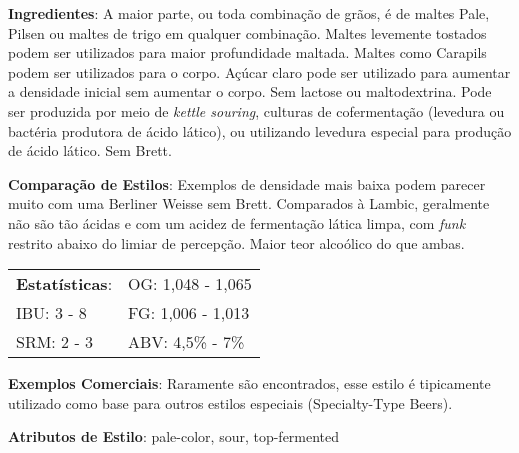 \textbf{Ingredientes}: A maior parte, ou toda combinação de grãos, é de maltes Pale, Pilsen ou maltes de trigo em qualquer combinação. Maltes levemente tostados podem ser utilizados para maior profundidade maltada. Maltes como Carapils podem ser utilizados para o corpo. Açúcar claro pode ser utilizado para aumentar a densidade inicial sem aumentar o corpo. Sem lactose ou maltodextrina. Pode ser produzida por meio de \textit{kettle souring}, culturas de cofermentação (levedura ou bactéria produtora de ácido lático), ou utilizando levedura especial para produção de ácido lático. Sem Brett.

\textbf{Comparação de Estilos}: Exemplos de densidade mais baixa podem parecer muito com uma Berliner Weisse sem Brett. Comparados à Lambic, geralmente não são tão ácidas e com um acidez de fermentação lática limpa, com \textit{funk} restrito abaixo do limiar de percepção. Maior teor alcoólico do que ambas.

\begin{tabular}{@{}p{35mm}p{35mm}@{}}
  \textbf{Estatísticas}: & OG: 1,048 - 1,065 \\
  IBU: 3 - 8  & FG: 1,006 - 1,013 \\
  SRM: 2 - 3  & ABV: 4,5\% - 7\%
\end{tabular}

\textbf{Exemplos Comerciais}: Raramente são encontrados, esse estilo é tipicamente utilizado como base para outros estilos especiais (Specialty-Type Beers).

\textbf{Atributos de Estilo}: pale-color, sour, top-fermented

